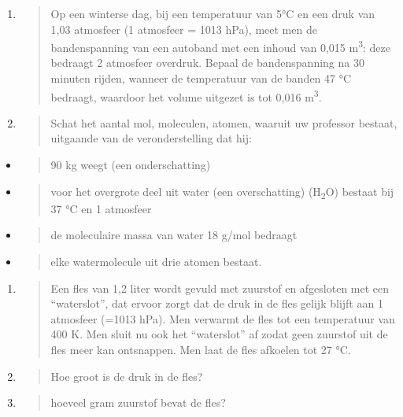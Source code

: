 \documentclass[]{article}
\begin{document}
\begin{enumerate}
\item
  \begin{quote}
  Op een winterse dag, bij een temperatuur van 5°C en een druk van 1,03
  atmosfeer (1 atmosfeer = 1013 hPa), meet men de bandenspanning van een
  autoband met een inhoud van 0,015 m\textsuperscript{3}: deze bedraagt
  2 atmosfeer overdruk. Bepaal de bandenspanning na 30 minuten rijden,
  wanneer de temperatuur van de banden 47 °C bedraagt, waardoor het
  volume uitgezet is tot 0,016 m\textsuperscript{3}.
  \end{quote}
\item
  \begin{quote}
  Schat het aantal mol, moleculen, atomen, waaruit uw professor bestaat,
  uitgaande van de veronderstelling dat hij:
  \end{quote}
\end{enumerate}

\begin{itemize}
\item
  \begin{quote}
  90 kg weegt (een onderschatting)
  \end{quote}
\item
  \begin{quote}
  voor het overgrote deel uit water (een overschatting)
  (H\textsubscript{2}O) bestaat bij 37 °C en 1 atmosfeer
  \end{quote}
\item
  \begin{quote}
  de moleculaire massa van water 18 g/mol bedraagt
  \end{quote}
\item
  \begin{quote}
  elke watermolecule uit drie atomen bestaat.
  \end{quote}
\end{itemize}

\begin{enumerate}
\def\labelenumi{\arabic{enumi}.}
\setcounter{enumi}{13}
\item
  \begin{quote}
  Een fles van 1,2 liter wordt gevuld met zuurstof en afgesloten met een
  ``waterslot'', dat ervoor zorgt dat de druk in de fles gelijk blijft
  aan 1 atmosfeer (=1013 hPa). Men verwarmt de fles tot een temperatuur
  van 400 K. Men sluit nu ook het ``waterslot'' af zodat geen zuurstof
  uit de fles meer kan ontsnappen. Men laat de fles afkoelen tot 27 °C.
  \end{quote}
\item
  \begin{quote}
  Hoe groot is de druk in de fles?
  \end{quote}
\item
  \begin{quote}
  hoeveel gram zuurstof bevat de fles?
  \end{quote}
\end{enumerate}
\end{document}
